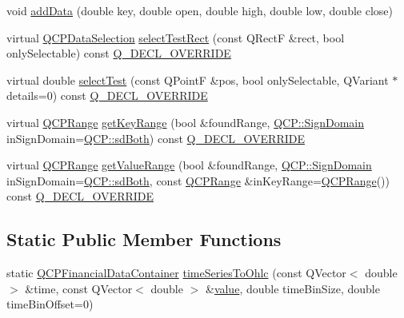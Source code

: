 \begin{DoxyCompactItemize}
\item 
void \mbox{\hyperlink{class_q_c_p_financial_a688bbd052e00a02954ddb0068b378170}{add\+Data}} (double key, double open, double high, double low, double close)
\item 
virtual \mbox{\hyperlink{class_q_c_p_data_selection}{Q\+C\+P\+Data\+Selection}} \mbox{\hyperlink{class_q_c_p_financial_a3c5beb1ab028a1dba845fc9dcffc7cf4}{select\+Test\+Rect}} (const Q\+RectF \&rect, bool only\+Selectable) const \mbox{\hyperlink{qcustomplot_8h_a42cc5eaeb25b85f8b52d2a4b94c56f55}{Q\+\_\+\+D\+E\+C\+L\+\_\+\+O\+V\+E\+R\+R\+I\+DE}}
\item 
virtual double \mbox{\hyperlink{class_q_c_p_financial_aac8e91622ac58330fa9ce81cc8fd40ee}{select\+Test}} (const Q\+PointF \&pos, bool only\+Selectable, Q\+Variant $\ast$details=0) const \mbox{\hyperlink{qcustomplot_8h_a42cc5eaeb25b85f8b52d2a4b94c56f55}{Q\+\_\+\+D\+E\+C\+L\+\_\+\+O\+V\+E\+R\+R\+I\+DE}}
\item 
virtual \mbox{\hyperlink{class_q_c_p_range}{Q\+C\+P\+Range}} \mbox{\hyperlink{class_q_c_p_financial_a15d68fb257113fef697356d65fa76559}{get\+Key\+Range}} (bool \&found\+Range, \mbox{\hyperlink{namespace_q_c_p_afd50e7cf431af385614987d8553ff8a9}{Q\+C\+P\+::\+Sign\+Domain}} in\+Sign\+Domain=\mbox{\hyperlink{namespace_q_c_p_afd50e7cf431af385614987d8553ff8a9aa38352ef02d51ddfa4399d9551566e24}{Q\+C\+P\+::sd\+Both}}) const \mbox{\hyperlink{qcustomplot_8h_a42cc5eaeb25b85f8b52d2a4b94c56f55}{Q\+\_\+\+D\+E\+C\+L\+\_\+\+O\+V\+E\+R\+R\+I\+DE}}
\item 
virtual \mbox{\hyperlink{class_q_c_p_range}{Q\+C\+P\+Range}} \mbox{\hyperlink{class_q_c_p_financial_a82d862aa134d78853f98f8c57a03415b}{get\+Value\+Range}} (bool \&found\+Range, \mbox{\hyperlink{namespace_q_c_p_afd50e7cf431af385614987d8553ff8a9}{Q\+C\+P\+::\+Sign\+Domain}} in\+Sign\+Domain=\mbox{\hyperlink{namespace_q_c_p_afd50e7cf431af385614987d8553ff8a9aa38352ef02d51ddfa4399d9551566e24}{Q\+C\+P\+::sd\+Both}}, const \mbox{\hyperlink{class_q_c_p_range}{Q\+C\+P\+Range}} \&in\+Key\+Range=\mbox{\hyperlink{class_q_c_p_range}{Q\+C\+P\+Range}}()) const \mbox{\hyperlink{qcustomplot_8h_a42cc5eaeb25b85f8b52d2a4b94c56f55}{Q\+\_\+\+D\+E\+C\+L\+\_\+\+O\+V\+E\+R\+R\+I\+DE}}
\end{DoxyCompactItemize}
\subsection*{Static Public Member Functions}
\begin{DoxyCompactItemize}
\item 
static \mbox{\hyperlink{qcustomplot_8h_ae36e482e04f19a54782f01ab38c354a6}{Q\+C\+P\+Financial\+Data\+Container}} \mbox{\hyperlink{class_q_c_p_financial_a9a058c035040d3939b8884f4aaccb1a7}{time\+Series\+To\+Ohlc}} (const Q\+Vector$<$ double $>$ \&time, const Q\+Vector$<$ double $>$ \&\mbox{\hyperlink{diffusion_8cpp_a4b41795815d9f3d03abfc739e666d5da}{value}}, double time\+Bin\+Size, double time\+Bin\+Offset=0)
\end{DoxyCompactItemize}
